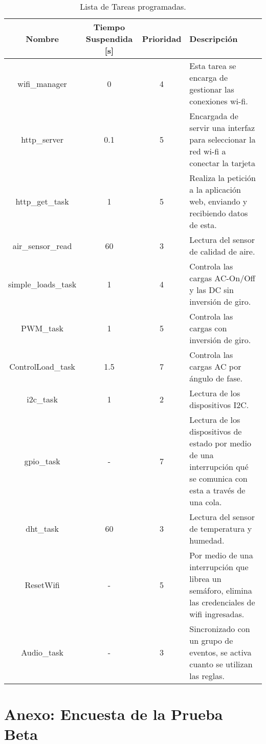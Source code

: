 \begin{appendix}
\begin{table}[H]
	\begin{center}
		\caption{Lista de Tareas programadas.}
		\label{table:tasks}
		\begin{tabular}{|c|c|c|p{5cm}|}
			\hline 
			Nombre & Tiempo Suspendida [s] & Prioridad & Descripción \\ 
			\hline 
			wifi\_manager & 0 & 4 & Esta tarea se encarga de gestionar las conexiones wi-fi. \\ 
			\hline 
			http\_server & 0.1 & 5 & Encargada de servir una interfaz para seleccionar la red wi-fi a conectar la tarjeta \\ 
			\hline 
			http\_get\_task & 1 & 5 & Realiza la petición a la aplicación web, enviando y recibiendo datos de esta. \\ 
			\hline 
			air\_sensor\_read& 60 & 3 & Lectura del sensor de calidad de aire. \\ 
			\hline 
			simple\_loads\_task& 1 & 4 & Controla las cargas AC-On/Off  y las DC sin inversión de giro. \\ 
			\hline 
			PWM\_task& 1 & 5 & Controla las cargas con inversión de giro. \\ 
			\hline 
			ControlLoad\_task& 1.5 & 7 & Controla las cargas AC por ángulo de fase. \\ 
			\hline 
			i2c\_task& 1 & 2 & Lectura de los dispositivos I2C. \\ 
			\hline 
			gpio\_task& - & 7 & Lectura de los dispositivos de estado por medio de una interrupción qué se comunica con esta a través de una cola. \\ 
			\hline 
			dht\_task& 60 & 3 & Lectura del sensor de temperatura y humedad. \\ 
			\hline 
			ResetWifi& - & 5 & Por medio de una interrupción que librea un semáforo, elimina las credenciales de wifi ingresadas. \\ 
			\hline 
			Audio\_task& - & 3 & Sincronizado con un grupo de eventos, se activa cuanto se utilizan las reglas. \\ 
			\hline 
		\end{tabular} 
	\end{center}
\end{table}

\chapter{Anexo: Encuesta de la Prueba Beta}\label{AnexoB}


\end{appendix}
